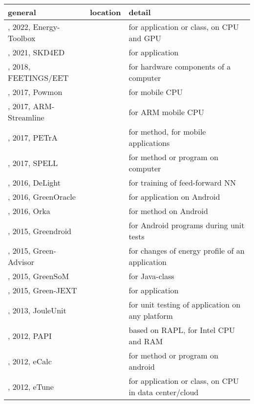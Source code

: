 \begin{tabular}{|>{\raggedright\arraybackslash}p{5cm}|p{1.6cm}|p{8.55cm}|}
\toprule
general & location & detail \\
\midrule
\cite{marantos2022}, 2022, Energy-Toolbox & \cite{pijnacker2023} & for application or class, on CPU and GPU \\
\cite{marantos2021}, 2021, SKD4ED & \cite{pijnacker2023} & for application \\
\cite{mancebo2018}, 2018, FEETINGS/EET & \cite{pijnacker2023} & for hardware components of a computer \\
\cite{walker2017}, 2017, Powmon & \cite{garcia-martin2019a} & for mobile CPU \\
\cite{rodrigues2017}, 2017, ARM-Streamline & \cite{garcia-martin2019a} & for ARM mobile CPU \\
\cite{nucci2017}, 2017, PETrA & \cite{ergasheva2020} & for method, for mobile applications \\
\cite{pereira2017}, 2017, SPELL & \cite{pijnacker2023} & for method or program on computer \\
\cite{rouhani2016}, 2016, DeLight & \cite{garcia-martin2019a} & for training of feed-forward NN \\
\cite{chowdhury2016}, 2016, GreenOracle & \cite{pijnacker2023} & for application on Android \\
\cite{westfield2016}, 2016, Orka & \cite{pijnacker2023} & for method on Android \\
\cite{couto2015}, 2015, Greendroid & \cite{rieger2017} & for Android programs during unit tests \\
\cite{aggarwal2015}, 2015, Green-Advisor & \cite{ergasheva2020} & for changes of energy profile of an application \\
\cite{cordero2015}, 2015, GreenSoM & \cite{pijnacker2023} & for Java-class \\
\cite{godboley2015}, 2015, Green-JEXT & \cite{pijnacker2023} & for application \\
\cite{wilke2013}, 2013, JouleUnit & \cite{rieger2017} & for unit testing of application on any platform \\
\cite{weaver2012}, 2012, PAPI & \cite{garcia-martin2019a} & based on RAPL, for Intel CPU and RAM \\
\cite{hao2012}, 2012, eCalc & \cite{pijnacker2023} & for method or program on android \\
\cite{ge2012}, 2012, eTune & \cite{pijnacker2023} & for application or class, on CPU in data center/cloud \\

\end{tabular}
